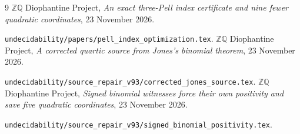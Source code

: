 \documentclass[11pt]{article}
\begin{document}
\begin{thebibliography}{9}
\small
\setlength{\itemsep}{2pt}
 \(\mathbb Z\mathbb Q\) Diophantine Project,
\emph{An exact three-Pell index certificate and nine fewer quadratic
coordinates}, 23 November 2026.\par
\nolinkurl{undecidability/papers/pell_index_optimization.tex}.
 \(\mathbb Z\mathbb Q\) Diophantine Project,
\emph{A corrected quartic source from Jones's binomial theorem},
23 November 2026.\par
\nolinkurl{undecidability/source_repair_v93/corrected_jones_source.tex}.
 \(\mathbb Z\mathbb Q\) Diophantine Project,
\emph{Signed binomial witnesses force their own positivity and save
five quadratic coordinates}, 23 November 2026.\par
\nolinkurl{undecidability/source_repair_v93/signed_binomial_positivity.tex}.
\end{thebibliography}
\end{document}
